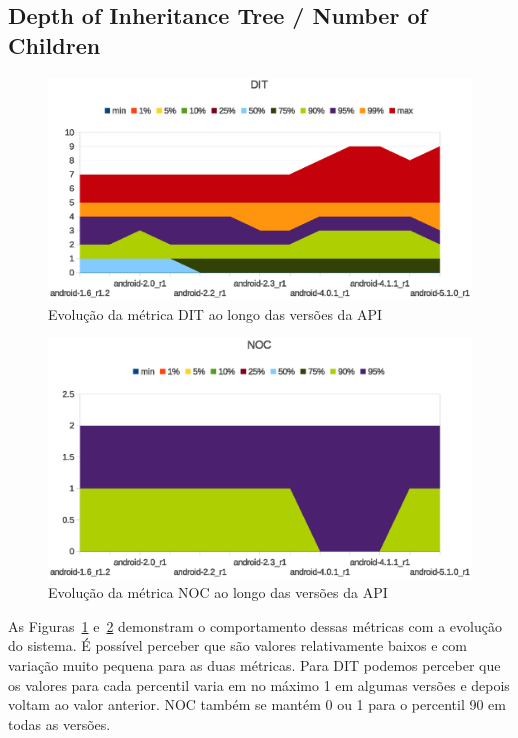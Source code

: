 \subsection{Depth of Inheritance Tree / Number of Children}

\begin{figure}[!htb]
\centering
\includegraphics [keepaspectratio=true,scale=0.85]{figuras/graphs/dit_android.eps}
\caption{Evolução da métrica DIT ao longo das versões da API}
\label{fig:dit_android}
\end{figure}

\begin{figure}[!htb]
\centering
\includegraphics [keepaspectratio=true,scale=0.85]{figuras/graphs/noc_android.eps}
\caption{Evolução da métrica NOC ao longo das versões da API}
\label{fig:noc_android}
\end{figure}

As Figuras~\ref{fig:dit_android} e~\ref{fig:noc_android} demonstram o comportamento dessas métricas com a evolução do sistema. É possível perceber que são valores relativamente baixos e com variação muito pequena para as duas métricas. Para DIT podemos perceber que os valores para cada percentil varia em no máximo 1 em algumas versões e depois voltam ao valor anterior. NOC também se mantém 0 ou 1 para o percentil 90 em todas as versões.

